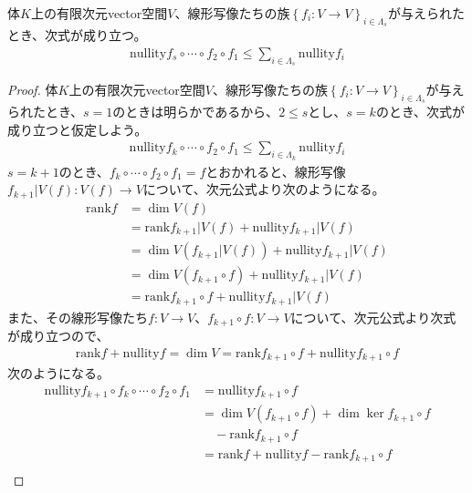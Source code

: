 \documentclass[dvipdfmx]{jsarticle}
\begin{document}
\begin{thm}
\label{2.2.4.6}
体$K$上の有限次元vector空間$V$、線形写像たちの族$\left\{ f_{i}:V \rightarrow V \right\}_{i \in \varLambda_{s}}$が与えられたとき、次式が成り立つ。
\begin{align*}
{\mathrm{nullity}}{f_{s} \circ \cdots \circ f_{2} \circ f_{1}} \leq \sum_{i \in \varLambda_{s}} {{\mathrm{nullity}}f_{i}}
\end{align*}
\end{thm}
\begin{proof}
体$K$上の有限次元vector空間$V$、線形写像たちの族$\left\{ f_{i}:V \rightarrow V \right\}_{i \in \varLambda_{s}}$が与えられたとき、$s = 1$のときは明らかであるから、$2 \leq s$とし、$s = k$のとき、次式が成り立つと仮定しよう。
\begin{align*}
{\mathrm{nullity}}{f_{k} \circ \cdots \circ f_{2} \circ f_{1}} \leq \sum_{i \in \varLambda_{k}} {{\mathrm{nullity}}f_{i}}
\end{align*}
$s = k + 1$のとき、$f_{k} \circ \cdots \circ f_{2} \circ f_{1} = f$とおかれると、線形写像$f_{k + 1}|V(f):V(f) \rightarrow V$について、次元公式より次のようになる。
\begin{align*}
{\mathrm{rank}}f &= \dim{V(f)}\\
&= {\mathrm{rank}}{f_{k + 1}|V(f)} + {\mathrm{nullity}}{f_{k + 1}|V(f)}\\
&= \dim{V\left( f_{k + 1}|V(f) \right)} + {\mathrm{nullity}}{f_{k + 1}|V(f)}\\
&= \dim{V\left( f_{k + 1} \circ f \right)} + {\mathrm{nullity}}{f_{k + 1}|V(f)}\\
&= {\mathrm{rank}}{f_{k + 1} \circ f} + {\mathrm{nullity}}{f_{k + 1}|V(f)}
\end{align*}
また、その線形写像たち$f:V \rightarrow V$、$f_{k + 1} \circ f:V \rightarrow V$について、次元公式より次式が成り立つので、
\begin{align*}
{\mathrm{rank}}f + {\mathrm{nullity}}f = \dim V = {\mathrm{rank}}{f_{k + 1} \circ f} + {\mathrm{nullity}}{f_{k + 1} \circ f}
\end{align*}
次のようになる。
\begin{align*}
{\mathrm{nullity}}{f_{k + 1} \circ f_{k} \circ \cdots \circ f_{2} \circ f_{1}} &= {\mathrm{nullity}}{f_{k + 1} \circ f}\\
&= \dim{V\left( f_{k + 1} \circ f \right)} + \dim{\ker{f_{k + 1} \circ f}} \\
&\quad - {\mathrm{rank}}{f_{k + 1} \circ f}\\
&= {\mathrm{rank}}f + {\mathrm{nullity}}f - {\mathrm{rank}}{f_{k + 1} \circ f}\\

\end{align*}
\end{proof}
\end{document}
